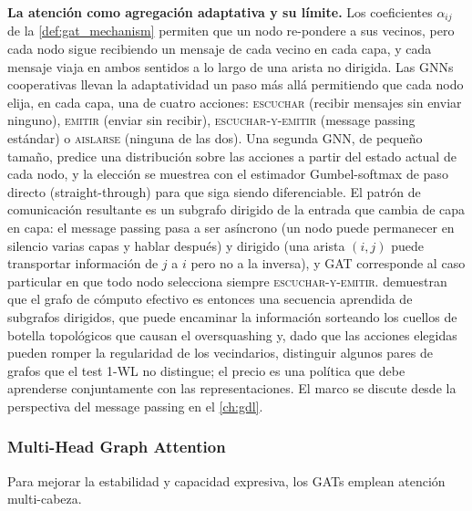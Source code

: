 \textbf{La atención como agregación adaptativa y su límite.} Los coeficientes $\alpha_{ij}$ de la \autoref{def:gat_mechanism} permiten que un nodo re-pondere a sus vecinos, pero cada nodo sigue recibiendo un mensaje de cada vecino en cada capa, y cada mensaje viaja en ambos sentidos a lo largo de una arista no dirigida. Las \glspl{GNN} cooperativas \citep{finkelshtein2024cognn} llevan la adaptatividad un paso más allá permitiendo que cada nodo elija, en cada capa, una de cuatro acciones: \textsc{escuchar} (recibir mensajes sin enviar ninguno), \textsc{emitir} (enviar sin recibir), \textsc{escuchar-y-emitir} (message passing estándar) o \textsc{aislarse} (ninguna de las dos). Una segunda \gls{GNN}, de pequeño tamaño, predice una distribución sobre las acciones a partir del estado actual de cada nodo, y la elección se muestrea con el estimador Gumbel-softmax de paso directo (straight-through) para que siga siendo diferenciable. El patrón de comunicación resultante es un subgrafo dirigido de la entrada que cambia de capa en capa: el message passing pasa a ser asíncrono (un nodo puede permanecer en silencio varias capas y hablar después) y dirigido (una arista $(i,j)$ puede transportar información de $j$ a $i$ pero no a la inversa), y \gls{GAT} corresponde al caso particular en que todo nodo selecciona siempre \textsc{escuchar-y-emitir}. \citet{finkelshtein2024cognn} demuestran que el grafo de cómputo efectivo es entonces una secuencia aprendida de subgrafos dirigidos, que puede encaminar la información sorteando los cuellos de botella topológicos que causan el \gls{oversquashing} y, dado que las acciones elegidas pueden romper la regularidad de los vecindarios, distinguir algunos pares de grafos que el test 1-WL no distingue; el precio es una política que debe aprenderse conjuntamente con las representaciones. El marco se discute desde la perspectiva del message passing en el \autoref{ch:gdl}.

\subsubsection{Multi-Head Graph Attention}\label{subsubsec:multihead_graph_attention}

Para mejorar la estabilidad y capacidad expresiva, los \glspl{GAT} emplean atención multi-cabeza.

